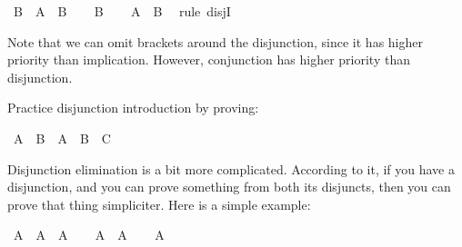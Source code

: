 \begin{isabellebody}
\isamarkupfalse%
\ {\isachardoublequoteopen}B\ {\isasymlongrightarrow}\ A\ {\isasymor}\ B{\isachardoublequoteclose}\isanewline
%
\isadelimproof
%
\endisadelimproof
%
\isatagproof
{}\isamarkupfalse%
\isanewline
\ \ \isamarkupfalse%
\ {\isachardoublequoteopen}B{\isachardoublequoteclose}\isanewline
\ \ \isamarkupfalse%
\ {\isachardoublequoteopen}A\ {\isasymor}\ B{\isachardoublequoteclose}\ \isamarkupfalse%
\ {\isacharparenleft}rule\ disjI{}{\isacharparenright}\isanewline
{}\isamarkupfalse%
%
\endisatagproof
{\isafoldproof}%
%
\isadelimproof
%
\endisadelimproof
%
\begin{isamarkuptext}%
Note that we can omit brackets around the disjunction, since it has higher priority than
implication. However, conjunction has higher priority than disjunction.%
\end{isamarkuptext}\isamarkuptrue%
%
\begin{isamarkuptext}%
\begin{Exercise} Practice disjunction introduction by proving: \end{Exercise}%
\end{isamarkuptext}\isamarkuptrue%
\isamarkupfalse%
\ {\isachardoublequoteopen}{\isacharparenleft}A\ {\isasymlongrightarrow}\ B{\isacharparenright}\ {\isasymlongrightarrow}\ {\isacharparenleft}A\ {\isasymlongrightarrow}\ B\ {\isasymor}\ C{\isacharparenright}{\isachardoublequoteclose}%
\isadelimproof
\ %
\endisadelimproof
%
\isatagproof
{}\isamarkupfalse%
%
\endisatagproof
{\isafoldproof}%
%
\isadelimproof
%
\endisadelimproof
%
\isamarkuptrue%
%
\begin{isamarkuptext}%
Disjunction elimination is a bit more complicated. According to it, if you have a disjunction,
and you can prove something from both its disjuncts, then you can prove that thing simpliciter.
Here is a simple example:%
\end{isamarkuptext}\isamarkuptrue%
\isamarkupfalse%
\ {\isachardoublequoteopen}A\ {\isasymor}\ A\ {\isasymlongrightarrow}\ A{\isachardoublequoteclose}\isanewline
%
\isadelimproof
%
\endisadelimproof
%
\isatagproof
{}\isamarkupfalse%
\isanewline
\ \ \isamarkupfalse%
\ {\isachardoublequoteopen}A\ {\isasymor}\ A{\isachardoublequoteclose}\isanewline
\ \ \isamarkupfalse%
\ {\isachardoublequoteopen}A{\isachardoublequoteclose}\isanewline

\end{isabellebody}
